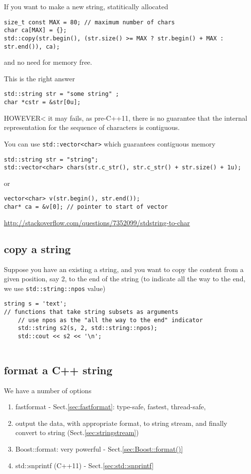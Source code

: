 If you want to make a new string, statitically allocated
\begin{verbatim}
size_t const MAX = 80; // maximum number of chars
char ca[MAX] = {};
std::copy(str.begin(), (str.size() >= MAX ? str.begin() + MAX : str.end()), ca);
\end{verbatim}
and no need for memory free.

This is the right answer
\begin{verbatim}
std::string str = "some string" ;
char *cstr = &str[0u];
\end{verbatim}
HOWEVER< it may fails, as pre-C++11, there is no guarantee that the internal
representation for the sequence of characters is contiguous.

You can use \verb!std::vector<char>! which guarantees contiguous memory
\begin{verbatim}
std::string str = "string";
std::vector<char> chars(str.c_str(), str.c_str() + str.size() + 1u);
\end{verbatim}
or
\begin{verbatim}
vector<char> v(str.begin(), str.end());
char* ca = &v[0]; // pointer to start of vector
\end{verbatim}

\url{http://stackoverflow.com/questions/7352099/stdstring-to-char}

\subsection{copy a string}


Suppose you have an existing a string, and you want to copy the content from a
given position, say 2, to the end of the string (to indicate all the way to the
end, we use \verb!std::string::npos! value)
\begin{lstlisting}
string s = 'text';
// functions that take string subsets as arguments 
    // use npos as the "all the way to the end" indicator
    std::string s2(s, 2, std::string::npos);
    std::cout << s2 << '\n';
 
\end{lstlisting}

\subsection{format a C++ string}
\label{sec:format-C++-string}

We have a number of options
\begin{enumerate}
  \item fastformat - Sect.\ref{sec:fastformat}: type-safe, fastest, thread-safe,
  
  
  \item output the data, with appropriate format, to string stream, and finally
  convert to string (Sect.\ref{sec:stringstream})
  
  \item Boost::format: very powerful - Sect.\ref{sec:Boost::format()}
  
  \item std::snprintf (C++11) - Sect.\ref{sec:std::snprintf}  
\end{enumerate}

